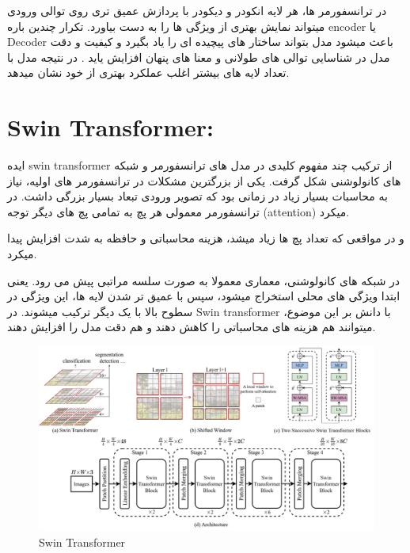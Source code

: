    
   در ترانسفورمر ها، هر لایه انکودر و دیکودر با پردازش عمیق تری روی توالی ورودی میتواند نمایش بهتری از ویژگی ها را به دست بیاورد.
   تکرار چندین باره encoder  یا Decoder باعث میشود مدل بتواند ساختار های پیچیده ای را یاد بگیرد و کیفیت و دقت مدل در شناسایی توالی های طولانی و معنا های پنهان افزایش یاید . در نتیجه مدل با تعداد لایه های بیشتر اغلب عملکرد بهتری از خود نشان میدهد.
   
   
   
\section{Swin Transformer:}

ایده swin transformer  از ترکیب چند مفهوم کلیدی در مدل های ترانسفورمر و شبکه های کانولوشنی شکل گرفت.
یکی از بزرگترین مشکلات در ترانسفورمر های اولیه، نیاز به محاسبات بسیار زیاد در زمانی بود که تصویر ورودی تبعاد بسیار بزرگی داشت.
در ترانسفورمر معمولی هر پچ به تمامی پچ های دیگر توجه (attention) میکرد.

و در مواقعی که تعداد پچ ها زیاد میشد، هزینه محاسباتی و حافظه به شدت افزایش پیدا میکرد.

در شبکه های کانولوشنی، معماری معمولا به صورت سلسه مراتبی پیش می رود.
یعنی ابتدا ویژگی های محلی استخراج میشود، سپس با عمیق تر شدن لایه ها، این ویژگی در سطوح بالا با یک دیگر ترکیب میشوند. در Swin transformer  با دانش بر این موضوع، میتوانند هم هزینه های محاسباتی را کاهش دهند و هم دقت مدل را افزایش دهند.

 
   
\begin{figure}[h]
	\centering
	\begin{minipage}[b]{1\textwidth}
		\centering
		\includegraphics[width=\textwidth]{transformer_images/swin_transformer.png}
		\caption{Swin Transformer}
		\label{fig:Cls Token In Vision Transformer}
	\end{minipage}
	\hfill
	
\end{figure}


